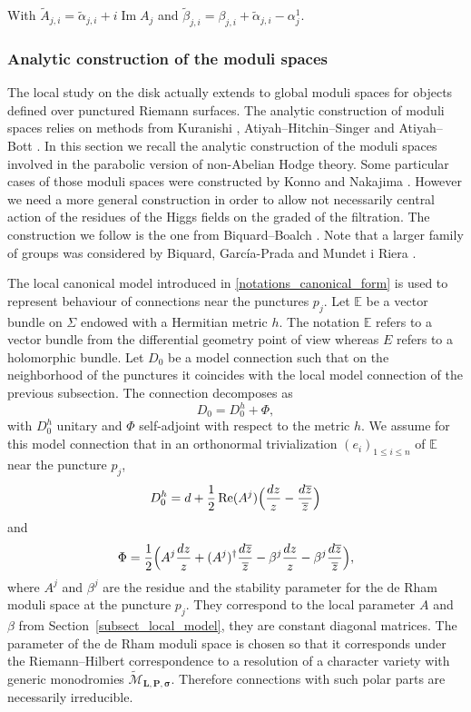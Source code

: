\documentclass[JEP,XML,SOM,NoEqCountersInSection,Unicode,published]{cedram}
\theoremstyle{definition}
\theoremstyle{plain}
\DeclareMathOperator{\Imm}{Im}
\DeclareMathOperator{\Ree}{Re}
\newcommand{\zbar}{\overline{z}}
\newcommand{\mlps}{\widetilde{\mathcal{M}}_{\boldsymbol{L},\boldsymbol{P},\boldsymbol{\sigma}}}
\begin{document}
With $\widetilde{A}_{j,i}= \widetilde{\alpha}_{j,i}+ i \Imm A_j$ and $\widetilde{\beta}_{j,i}=\beta_{j,i}+\widetilde{\alpha}_{j,i}-\alpha^1_j$.

\label{sect_diffeo_ms}
\subsubsection{Analytic construction of the moduli spaces}\label{sect_global_moduli}
The local study on the disk actually extends to global moduli spaces for objects defined over punctured Riemann surfaces. The analytic construction of moduli spaces relies on methods from Kuranishi \cite{Kuranishi}, Atiyah--Hitchin--Singer \cite{Atiyah_Hitchin_Singer} and Atiyah--Bott \cite{Atiyah_Bott}. In this section we recall the analytic construction of the moduli spaces involved in the parabolic version of non-Abelian Hodge theory. Some particular cases of those moduli spaces were constructed by Konno \cite{Konno} and Nakajima \cite{Nakajima_1996}. However we need a more general construction in order to allow not necessarily central action of the residues of the Higgs fields on the graded of the filtration. The construction we follow is the one from Biquard--Boalch \cite{Biquard_Boalch_2004}. Note that a larger family of groups was considered by Biquard, García-Prada and Mundet i Riera \cite{Biquard_Garcia_Prada_Riera}.

The local canonical model introduced in \ref{notations_canonical_form} is used to represent behaviour of connections near the punctures $p_j$. Let $\mathbb{E}$ be a vector bundle on $\Sigma$ endowed with a Hermitian metric $h$. The notation $\mathbb{E}$ refers to a vector bundle from the differential geometry point of view whereas $E$ refers to a holomorphic bundle. Let $D_0$ be a model connection such that on the neighborhood of the punctures it coincides with the local model connection of the previous subsection. The connection decomposes as
\[
D_0 = D_0^h + \Phi,
\]
with $D_0^h$ unitary and $\Phi$ self-adjoint with respect to the metric $h$. We assume for this model connection that in an orthonormal trivialization $(e_i)_{1\le i \le n}$ of $\mathbb{E}$ near the puncture $p_j$,
\[
D^h_0 = d + \frac{1}{2} \Ree(A^j) \Bigl(\frac{d z}{z} - \frac{d \zbar}{\zbar}\Bigr)
\]
and
\[
\Phi = \frac{1}{2} \Bigl(A^j\frac{d z}{z} + (A^j)^{\dagger}\frac{d\overline{z}}{\overline{z}} - \beta^j \frac{d z}{z} - \beta^j \frac{d \overline{z}}{\overline{z}}\Bigr),
\]
where $A^j$ and $\beta^j$ are the residue and the stability parameter for the de Rham moduli space at the puncture $p_j$. They correspond to the local parameter $A$ and $\beta$ from Section~\ref{subsect_local_model}, they are constant diagonal matrices. The parameter of the de Rham moduli space is chosen so that it corresponds under the Riemann--Hilbert correspondence to a resolution of a character variety with generic monodromies $\mlps$. Therefore connections with such polar parts are necessarily irreducible.
\end{document}
